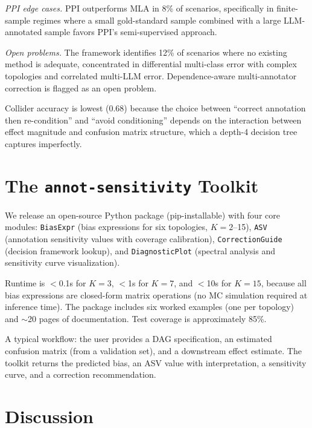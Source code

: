 \documentclass[11pt]{article}
\begin{document}
\textit{PPI edge cases.}
PPI outperforms MLA in 8\% of scenarios, specifically in finite-sample regimes where a small gold-standard sample combined with a large LLM-annotated sample favors PPI's semi-supervised approach.

\textit{Open problems.}
The framework identifies 12\% of scenarios where no existing method is adequate, concentrated in differential multi-class error with complex topologies and correlated multi-LLM error.
Dependence-aware multi-annotator correction is flagged as an open problem.

Collider accuracy is lowest (0.68) because the choice between ``correct annotation then re-condition'' and ``avoid conditioning'' depends on the interaction between effect magnitude and confusion matrix structure, which a depth-4 decision tree captures imperfectly.

\section{The \texttt{annot-sensitivity} Toolkit}\label{sec:toolkit}

We release an open-source Python package (pip-installable) with four core modules:
\texttt{BiasExpr} (bias expressions for six topologies, $K=2$--15),
\texttt{ASV} (annotation sensitivity values with coverage calibration),
\texttt{CorrectionGuide} (decision framework lookup), and
\texttt{DiagnosticPlot} (spectral analysis and sensitivity curve visualization).

Runtime is $<$0.1s for $K=3$, $<$1s for $K=7$, and $<$10s for $K=15$, because all bias expressions are closed-form matrix operations (no MC simulation required at inference time).
The package includes six worked examples (one per topology) and $\sim$20 pages of documentation.
Test coverage is approximately 85\%.

A typical workflow: the user provides a DAG specification, an estimated confusion matrix (from a validation set), and a downstream effect estimate.
The toolkit returns the predicted bias, an ASV value with interpretation, a sensitivity curve, and a correction recommendation.

\section{Discussion}
\end{document}
